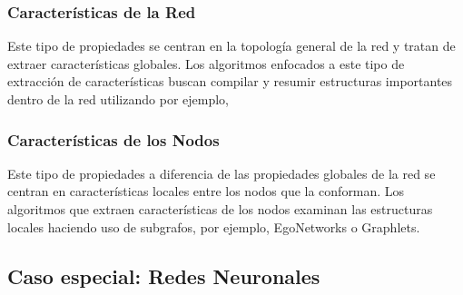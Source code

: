 \subsubsection{Características de la Red}
Este tipo de propiedades se centran en la topología general de la red y tratan de extraer características globales. Los algoritmos enfocados a este tipo de extracción de características buscan compilar y resumir estructuras importantes dentro de la red utilizando por ejemplo,

\begin{comment}
    \begin{center}
    \begin{tabular}{ |p{8cm}|p{2cm}|  }
    \hline
    \multicolumn{2}{|c|}{Graph Embedding} \\
    \hline
    Paper & Algoritmo \\
    \hline
    “Graph2Vec: Learning Distributed Representations of Graphs” & Graph2Vec  \\
    \hline
    “Hunt For The Unique, Stable, Sparse And Fast Feature Learning On Graphs” & FGSD \\
    \hline
    “A Simple Baseline Algorithm for Graph Classification” & SF \\
    \hline
    “NetLSD: Hearing the Shape of a Graph” & NetLSD \\
    \hline
    “GL2vec: Graph Embedding Enriched by Line Graphs with Edge Features” & GL2Vec \\
    \hline
    “Geometric Scattering for Graph Data Analysis” & GeoScattering \\
    \hline
    “Invariant Embedding for Graph Classification” & IGE \\
    \hline
    \end{tabular}
    \end{center}
\end{comment}

\subsubsection{Características de los Nodos} Este tipo de propiedades a diferencia de las propiedades globales de la red se centran en características locales entre los nodos que la conforman. Los algoritmos que extraen características de los nodos examinan las estructuras locales haciendo uso de subgrafos, por ejemplo, EgoNetworks o Graphlets.

\subsection{Caso especial: Redes Neuronales}

